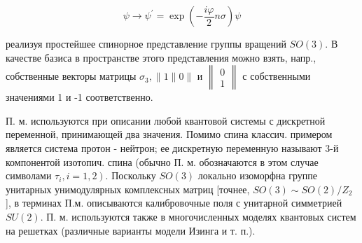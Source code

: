 \documentclass[10pt]{article}
\begin{document}
\[

\psi \rightarrow \psi^{\prime}=\exp \left(-\frac{i \varphi}{2} n \sigma\right) \psi

\]



реализуя простейшее спинорное представление группы вращений $S O(3)$. В качестве базиса в пространстве этого представления можно взять, напр., собственные векторы матрицы $\sigma_{3},\|1\| 0 \|$ и $\left\|\begin{array}{l}0 \\ 1\end{array}\right\|$ с собственными значениями 1 и -1 соответственно.



П. м. используются при описании любой квантовой системы с дискретной переменной, принимающей два значения. Помимо спина классич. примером является система протон - нейтрон; ее дискретную переменную называют 3-й компонентой изотопич. спина (обычно П. м. обозначаются в этом случае символами $\left.\tau_{i}, i=1,2\right)$. Поскольку $S O(3)$ локально изоморфна группе унитарных унимодулярных комплексных матриц [точнее, $S O(3) \sim S O(2) / Z_{2}$ ], в терминах П.м. описываются калибровочные поля с унитарной симметрией $S U(2)$. П. м. используются также в многочисленных моделях квантовых систем на решетках (различные варианты модели Изинга и т. п.).
\end{document}
